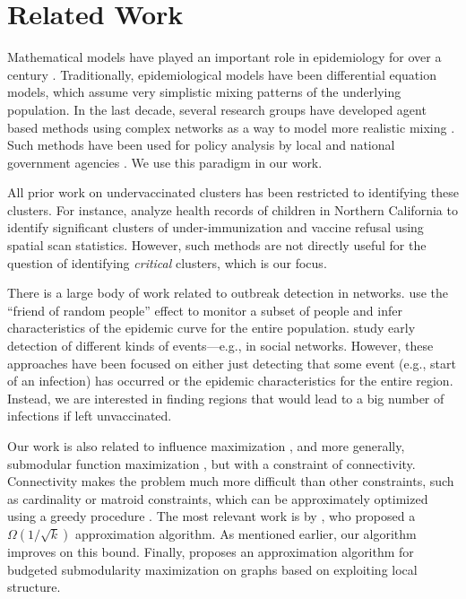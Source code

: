 \section{Related Work}
Mathematical models have played an important role in epidemiology for over a century \cite{anderson+m:book}. Traditionally, epidemiological models have been differential equation models, which assume very simplistic mixing patterns of the underlying population. In the last decade, several research groups have developed agent based methods using complex networks as a way to model more realistic mixing
\cite{eubank:nature04,longini05:science,fc+06,Liu2015}.
Such methods have been used for policy analysis
by local and national government agencies \cite{halloran:pnas08}.
We use this paradigm in our work.

All prior work on undervaccinated clusters has been restricted to identifying these clusters.
For instance, \cite{lieu2015geographic} analyze health records 
of children in Northern California to identify
significant clusters of under-immunization and vaccine refusal
using spatial scan statistics. However, such methods are not directly useful for the
question of identifying \emph{critical} clusters, which is our focus.

There is a large body of work related to outbreak detection in networks. \cite{christakis:10:sensor} use the ``friend of random people'' effect to monitor a subset of people and infer characteristics of the epidemic curve for the entire population. \cite{Leskovec@KDD07} study early detection of different kinds of events---e.g., in social networks. However, these approaches have been focused on either just detecting that some event (e.g., start of an infection) has occurred or the epidemic characteristics for the entire region. Instead, we are interested in finding regions that would lead to a big number of infections if left unvaccinated.

Our work is also related to influence maximization \cite{kempe:sigkdd03}, and more generally, 
submodular function maximization \cite{Krause2014SubmodularFM}, but with a constraint of connectivity. Connectivity makes the problem much more difficult than other constraints, such as cardinality or matroid constraints, which can be approximately optimized using a greedy procedure \cite{nemhauser1978analysis}. 
The most relevant work is by \cite{kuo2015maximizing}, who proposed a 
$\Omega(1/\sqrt{k})$ approximation algorithm. As mentioned earlier, our algorithm \algosubmod{} improves on this bound. Finally,
\cite{krause2006near} proposes an approximation algorithm for budgeted 
submodularity maximization on graphs based on exploiting local structure. 

